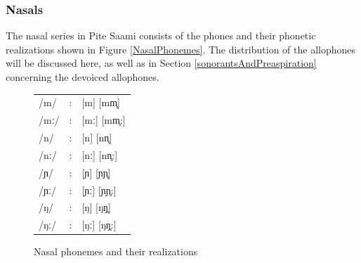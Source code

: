 \subsubsection{Nasals}\label{Nasals}%
The nasal series in Pite Saami consists of the phones and their phonetic realizations shown in Figure \vref{NasalPhonemes}. The distribution of the allophones will be discussed here, as well as in Section \ref{sonorantsAndPreaspiration} concerning the devoiced allophones. 
\begin{figure}\centering
\begin{tabular}{l c l}
/m/ &:& [m] [mm̥] \\ %
/mː/ &:& [mː] [mm̥:] \\ %
/n/ &:& [n] [nn̥] \\ %
/nː/ &:& [nː] [nn̥:]\\ %
/ɲ/ &:& [ɲ] [ɲɲ̥]\\ %
/ɲː/ &:& [ɲː] [ɲɲ̥:]\\ %
/ŋ/ &:& [ŋ] [ŋŋ̥]\\ %
/ŋː/ &:& [ŋː] [ŋŋ̥:]\\ %
\end{tabular}
\caption{Nasal phonemes and their realizations}\label{NasalPhonemes}
\end{figure}


